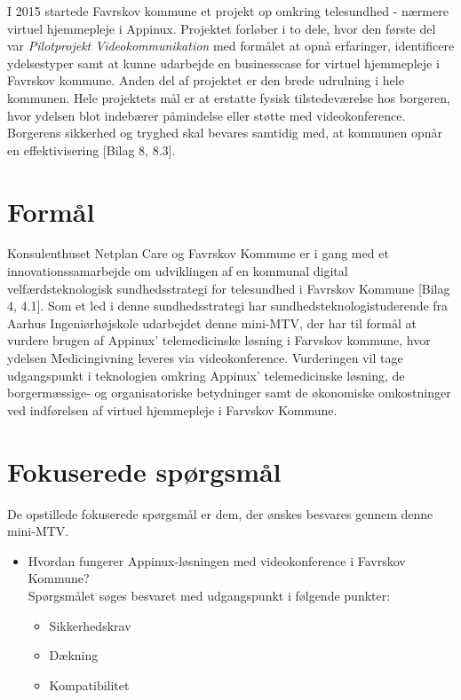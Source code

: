 I 2015 startede Favrskov kommune et projekt op omkring telesundhed - nærmere virtuel hjemmepleje i Appinux. Projektet forløber i to dele, hvor den første del var \textit{Pilotprojekt Videokommunikation} med formålet at opnå erfaringer, identificere ydelsestyper samt at kunne udarbejde en businesscase for virtuel hjemmepleje i Favrskov kommune. Anden del af projektet er den brede udrulning i hele kommunen. Hele projektets mål er at erstatte fysisk tilstedeværelse hos borgeren, hvor ydelsen blot indebærer påmindelse eller støtte med videokonference. Borgerens sikkerhed og tryghed skal bevares samtidig med, at kommunen opnår en effektivisering [Bilag 8, 8.3]. 

\section{Formål}
Konsulenthuset Netplan Care og Favrskov Kommune er i gang med et innovationssamarbejde om udviklingen af en kommunal digital velfærdsteknologisk sundhedsstrategi for telesundhed i Favrskov Kommune [Bilag 4, 4.1]. Som et led i denne sundhedsstrategi har sundhedsteknologistuderende fra Aarhus Ingeniørhøjskole udarbejdet denne mini-MTV, der har til formål at vurdere brugen af Appinux' telemedicinske løsning i Farvskov kommune, hvor ydelsen Medicingivning 
 leveres via videokonference. Vurderingen vil tage udgangspunkt i teknologien omkring Appinux' telemedicinske løsning, de borgermæssige- og organisatoriske betydninger samt de økonomiske omkostninger ved indførelsen af virtuel hjemmepleje i Farvskov Kommune.  

\section{Fokuserede spørgsmål}
De opstillede fokuserede spørgsmål er dem, der ønskes besvares gennem denne mini-MTV. 

\begin{itemize}
	\item Hvordan fungerer Appinux-løsningen med videokonference i Favrskov Kommune? \\Spørgsmålet søges besvaret med udgangspunkt i følgende punkter:
	\begin{itemize}
	\item Sikkerhedskrav
	\item Dækning %
	\item Kompatibilitet 
\end{itemize}
\end{itemize}

